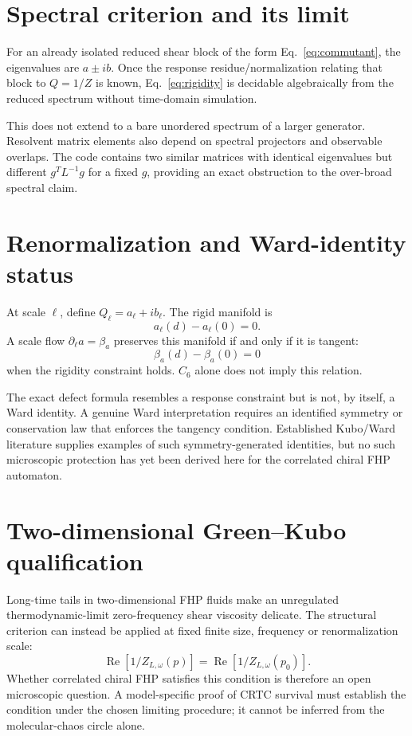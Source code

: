 \documentclass[11pt]{article}
\newcommand{\Ree}{\operatorname{Re}}
\begin{document}
\section{Spectral criterion and its limit}
For an already isolated reduced shear block of the form Eq.~\eqref{eq:commutant}, the eigenvalues are $a\pm ib$.  Once the response residue/normalization relating that block to $Q=1/Z$ is known, Eq.~\eqref{eq:rigidity} is decidable algebraically from the reduced spectrum without time-domain simulation.

This does not extend to a bare unordered spectrum of a larger generator.  Resolvent matrix elements also depend on spectral projectors and observable overlaps.  The code contains two similar matrices with identical eigenvalues but different $g^TL^{-1}g$ for a fixed $g$, providing an exact obstruction to the over-broad spectral claim.

\section{Renormalization and Ward-identity status}
At scale $\ell$, define $Q_\ell=a_\ell+ib_\ell$.  The rigid manifold is
\begin{equation}
 a_\ell(d)-a_\ell(0)=0.
\end{equation}
A scale flow $\partial_\ell a=\beta_a$ preserves this manifold if and only if it is tangent:
\begin{equation}
 \beta_a(d)-\beta_a(0)=0
\end{equation}
when the rigidity constraint holds.  $C_6$ alone does not imply this relation.

The exact defect formula resembles a response constraint but is not, by itself, a Ward identity.  A genuine Ward interpretation requires an identified symmetry or conservation law that enforces the tangency condition.  Established Kubo/Ward literature supplies examples of such symmetry-generated identities, but no such microscopic protection has yet been derived here for the correlated chiral FHP automaton.

\section{Two-dimensional Green--Kubo qualification}
Long-time tails in two-dimensional FHP fluids make an unregulated thermodynamic-limit zero-frequency shear viscosity delicate.  The structural criterion can instead be applied at fixed finite size, frequency or renormalization scale:
\begin{equation}
 \Ree[1/Z_{L,\omega}(p)]=\Ree[1/Z_{L,\omega}(p_0)].
\end{equation}
Whether correlated chiral FHP satisfies this condition is therefore an open microscopic question. A model-specific proof of CRTC survival must establish the condition under the chosen limiting procedure; it cannot be inferred from the molecular-chaos circle alone.
\end{document}

